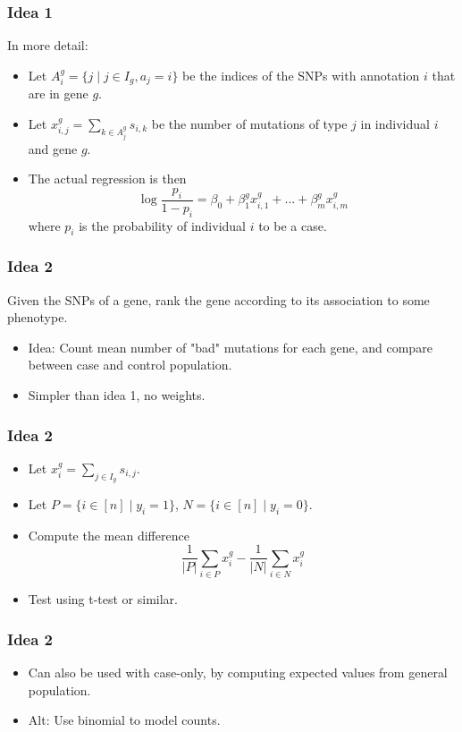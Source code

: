 \documentclass{beamer}
\begin{document}
\begin{frame}
	\frametitle{Idea 1}
	In more detail:
	\begin{itemize}
		\item Let $A_i^g = \{ j \mid j \in I_g, a_j = i \}$ be the indices of the SNPs with annotation $i$ that are in gene $g$.
		\item Let $x_{i,j}^g = \sum_{k \in A_j^g} s_{i,k}$ be the number of mutations of type $j$ in individual $i$ and gene $g$.
		\item The actual regression is then
		$$ \log \frac{p_i}{1-p_i} = \beta_0 + \beta_1^g x_{i,1}^g + ... + \beta_m^g x_{i,m}^g$$
		where $p_i$ is the probability of individual $i$ to be a case.
	\end{itemize}
\end{frame}

\begin{frame}
	\frametitle{Idea 2}
	Given the SNPs of a gene, rank the gene according to its association to some phenotype.
	\begin{itemize}
		\item Idea: Count mean number of "bad" mutations for each gene, and compare between case and control population.
		\item Simpler than idea 1, no weights.
	\end{itemize}
\end{frame}

\begin{frame}
	\frametitle{Idea 2}
	\begin{itemize}
		\item Let $x_i^g = \sum_{j \in I_g} s_{i,j}$.
		\item Let $P = \{ i \in [n] \mid y_i = 1 \}$, $N = \{ i \in [n] \mid y_i = 0 \}$.
		\item Compute the mean difference $$\frac{1}{|P|}\sum_{i \in P} x_i^g - \frac{1}{|N|}\sum_{i \in N} x_i^g$$
		\item Test using t-test or similar.
	\end{itemize}
\end{frame}

\begin{frame}
	\frametitle{Idea 2}
	\begin{itemize}
		\item Can also be used with case-only, by computing expected values from general population.
		\item Alt: Use binomial to model counts.
	\end{itemize}
\end{frame}
\end{document}
